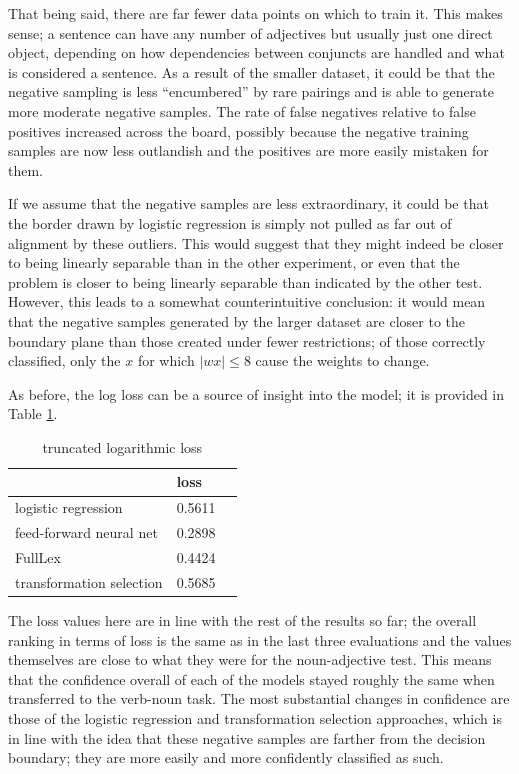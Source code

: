 \documentclass[a4paper, 12pt]{article}
\begin{document}
That being said, there are far fewer data points on which to train it. This makes sense; a sentence can have any number of adjectives but usually just one direct object, depending on how dependencies between conjuncts are handled and what is considered a sentence. As a result of the smaller dataset, it could be that the negative sampling is less ``encumbered'' by rare pairings and is able to generate more moderate negative samples. The rate of false negatives relative to false positives increased across the board, possibly because the negative training samples are now less outlandish and the positives are more easily mistaken for them.

If we assume that the negative samples are less extraordinary, it could be that the border drawn by logistic regression is simply not pulled as far out of alignment by these outliers. This would suggest that they might indeed be closer to being linearly separable than in the other experiment, or even that the problem is closer to being linearly separable than indicated by the other test. However, this leads to a somewhat counterintuitive conclusion: it would mean that the negative samples generated by the larger dataset are closer to the boundary plane than those created under fewer restrictions; of those correctly classified, only the $ x $ for which $ | wx | \leq 8 $ cause the weights to change.

As before, the log loss can be a source of insight into the model; it is provided in Table \ref{loss-vn}.

\begin{table}[]
	\centering
	\begin{tabular}{l|l|l}
		                         & loss      \\ \hline
		logistic regression      & 0.5611    \\
		feed-forward neural net  & 0.2898    \\
		FullLex                  & 0.4424    \\
		transformation selection & 0.5685
	\end{tabular}
	\caption{truncated logarithmic loss}
	\label{loss-vn}
\end{table}

The loss values here are in line with the rest of the results so far; the overall ranking in terms of loss is the same as in the last three evaluations and the values themselves are close to what they were for the noun-adjective test. This means that the confidence overall of each of the models stayed roughly the same when transferred to the verb-noun task. The most substantial changes in confidence are those of the logistic regression and transformation selection approaches, which is in line with the idea that these negative samples are farther from the decision boundary; they are more easily and more confidently classified as such.
\end{document}
